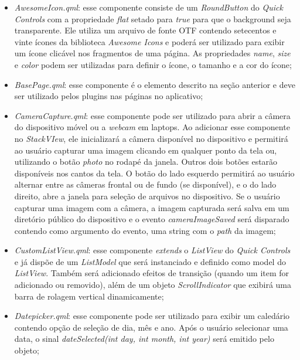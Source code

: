 \begin{itemize}
	\item \textit{AwesomeIcon.qml}: esse componente consiste de um \textit{RoundButton} do \textit{Quick Controls} com a propriedade \textit{flat} setado para \textit{true} para que o background seja transparente. Ele utiliza um arquivo de fonte OTF contendo setecentos e vinte ícones da biblioteca \textit{Awesome Icons} e poderá ser utilizado para exibir um ícone clicável nos fragmentos de uma página. As propriedades \textit{name}, \textit{size} e \textit{color} podem ser utilizadas para definir o ícone, o tamanho e a cor do ícone;

	\item \textit{BasePage.qml}: esse componente é o elemento descrito na seção anterior e deve ser utilizado pelos plugins nas páginas no aplicativo;

	\item \textit{CameraCapture.qml}: esse componente pode ser utilizado para abrir a câmera do dispositivo móvel ou a \textit{webcam} em laptops. Ao adicionar esse componente no \textit{StackVIew}, ele inicializará a câmera disponível no dispositivo e permitirá ao usuário capturar uma imagem clicando em qualquer ponto da tela ou, utilizando o botão \textit{photo} no rodapé da janela. Outros dois botões estarão disponíveis nos cantos da tela. O botão do lado esquerdo permitirá ao usuário alternar entre as câmeras frontal ou de fundo (se disponível), e o do lado direito, abre a janela para seleção de arquivos no dispositivo. Se o usuário capturar uma imagem com a câmera, a imagem capturada será salva em um diretório público do dispositivo e o evento \textit{cameraImageSaved} será disparado contendo como argumento do evento, uma string com o \textit{path} da imagem;

	\item \textit{CustomListView.qml}: esse componente \textit{extends} o \textit{ListView} do \textit{Quick Controls} e já dispõe de um \textit{ListModel} que será instanciado e definido como model do \textit{ListView}. Também será adicionado efeitos de transição (quando um item for adicionado ou removido), além de um objeto \textit{ScrollIndicator} que exibirá uma barra de rolagem vertical dinamicamente;

	\item \textit{Datepicker.qml}: esse componente pode ser utilizado para exibir um caledário contendo opção de seleção de dia, mês e ano. Após o usuário selecionar uma data, o sinal \textit{dateSelected(int day, int month, int year)} será emitido pelo objeto;


\end{itemize}
